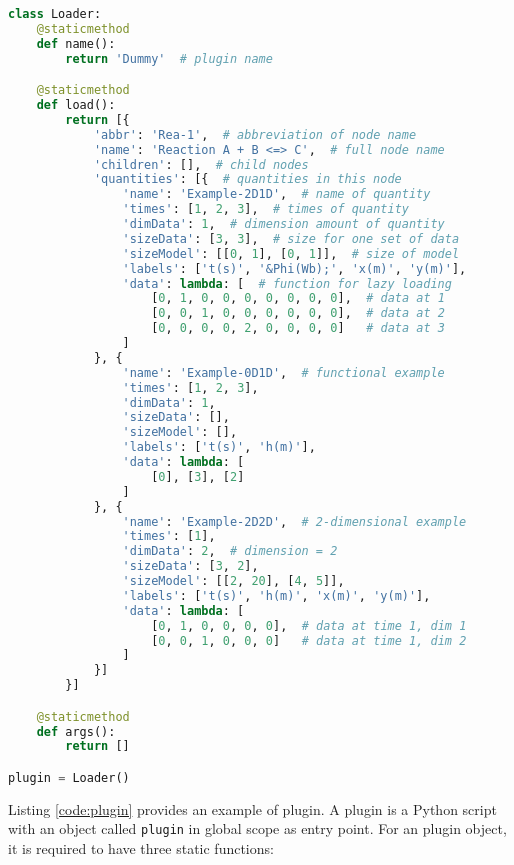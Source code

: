 \begin{lstfloat}
\begin{lstlisting}[language = python, style = mybase, label = code:plugin,
    caption = Example for a plugin]
class Loader:
    @staticmethod
    def name():
        return 'Dummy'  # plugin name

    @staticmethod
    def load():
        return [{
            'abbr': 'Rea-1',  # abbreviation of node name
            'name': 'Reaction A + B <=> C',  # full node name
            'children': [],  # child nodes
            'quantities': [{  # quantities in this node
                'name': 'Example-2D1D',  # name of quantity
                'times': [1, 2, 3],  # times of quantity
                'dimData': 1,  # dimension amount of quantity
                'sizeData': [3, 3],  # size for one set of data
                'sizeModel': [[0, 1], [0, 1]],  # size of model
                'labels': ['t(s)', '&Phi(Wb);', 'x(m)', 'y(m)'],
                'data': lambda: [  # function for lazy loading
                    [0, 1, 0, 0, 0, 0, 0, 0, 0],  # data at 1
                    [0, 0, 1, 0, 0, 0, 0, 0, 0],  # data at 2
                    [0, 0, 0, 0, 2, 0, 0, 0, 0]   # data at 3
                ]
            }, {
                'name': 'Example-0D1D',  # functional example
                'times': [1, 2, 3],
                'dimData': 1,
                'sizeData': [],
                'sizeModel': [],
                'labels': ['t(s)', 'h(m)'],
                'data': lambda: [
                    [0], [3], [2]
                ]
            }, {
                'name': 'Example-2D2D',  # 2-dimensional example
                'times': [1],
                'dimData': 2,  # dimension = 2
                'sizeData': [3, 2],
                'sizeModel': [[2, 20], [4, 5]],
                'labels': ['t(s)', 'h(m)', 'x(m)', 'y(m)'],
                'data': lambda: [
                    [0, 1, 0, 0, 0, 0],  # data at time 1, dim 1
                    [0, 0, 1, 0, 0, 0]   # data at time 1, dim 2
                ]
            }]
        }]

    @staticmethod
    def args():
        return []

plugin = Loader()
\end{lstlisting}
\end{lstfloat}

Listing \ref{code:plugin} provides an example of plugin. A plugin is a Python script with an object called \texttt{plugin} in global scope as entry point. For an plugin object, it is required to have three static functions:

